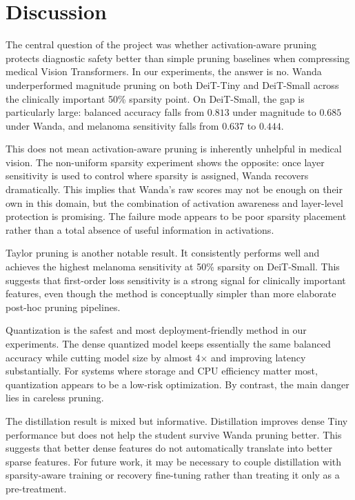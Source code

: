 \documentclass[11pt]{article}
\begin{document}
\section{Discussion}
The central question of the project was whether activation-aware pruning protects diagnostic safety better than simple pruning baselines when compressing medical Vision Transformers. In our experiments, the answer is no. Wanda underperformed magnitude pruning on both DeiT-Tiny and DeiT-Small across the clinically important 50\% sparsity point. On DeiT-Small, the gap is particularly large: balanced accuracy falls from $0.813$ under magnitude to $0.685$ under Wanda, and melanoma sensitivity falls from $0.637$ to $0.444$.

This does not mean activation-aware pruning is inherently unhelpful in medical vision. The non-uniform sparsity experiment shows the opposite: once layer sensitivity is used to control where sparsity is assigned, Wanda recovers dramatically. This implies that Wanda's raw scores may not be enough on their own in this domain, but the combination of activation awareness and layer-level protection is promising. The failure mode appears to be poor sparsity placement rather than a total absence of useful information in activations.

Taylor pruning is another notable result. It consistently performs well and achieves the highest melanoma sensitivity at 50\% sparsity on DeiT-Small. This suggests that first-order loss sensitivity is a strong signal for clinically important features, even though the method is conceptually simpler than more elaborate post-hoc pruning pipelines.

Quantization is the safest and most deployment-friendly method in our experiments. The dense quantized model keeps essentially the same balanced accuracy while cutting model size by almost 4$\times$ and improving latency substantially. For systems where storage and CPU efficiency matter most, quantization appears to be a low-risk optimization. By contrast, the main danger lies in careless pruning.

The distillation result is mixed but informative. Distillation improves dense Tiny performance but does not help the student survive Wanda pruning better. This suggests that better dense features do not automatically translate into better sparse features. For future work, it may be necessary to couple distillation with sparsity-aware training or recovery fine-tuning rather than treating it only as a pre-treatment.
\end{document}
